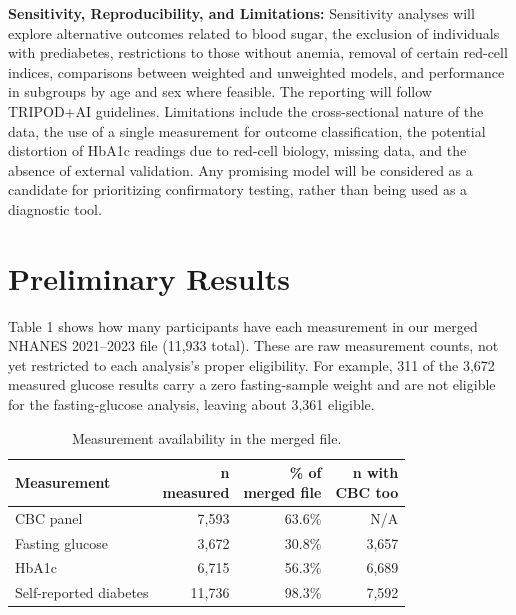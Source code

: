 \documentclass[conference]{IEEEtran}
\begin{document}
\noindent\textbf{Sensitivity, Reproducibility, and Limitations:} Sensitivity analyses will explore alternative outcomes related to blood sugar, the exclusion of individuals with prediabetes, restrictions to those without anemia, removal of certain red-cell indices, comparisons between weighted and unweighted models, and performance in subgroups by age and sex where feasible. The reporting will follow TRIPOD+AI guidelines. Limitations include the cross-sectional nature of the data, the use of a single measurement for outcome classification, the potential distortion of HbA1c readings due to red-cell biology, missing data, and the absence of external validation. Any promising model will be considered as a candidate for prioritizing confirmatory testing, rather than being used as a diagnostic tool.


\section{Preliminary Results}

Table 1 shows how many participants have each measurement in our merged NHANES 2021--2023 file (11,933 total). These are raw measurement counts, not yet restricted to each analysis's proper eligibility. For example, 311 of the 3,672 measured glucose results carry a zero fasting-sample weight and are not eligible for the fasting-glucose analysis, leaving about 3,361 eligible.



\begin{table}[H]
\caption{Measurement availability in the merged file.}
\label{tab:availability}
\centering
\footnotesize
\setlength{\tabcolsep}{3.6pt}
\renewcommand{\arraystretch}{1.18}
\begin{tabular}{@{}lrrr@{}}
\toprule
Measurement & \shortstack{n\\measured} & \shortstack{\% of\\merged file} & \shortstack{n with\\CBC too} \\
\midrule
CBC panel & 7,593 & 63.6\% & N/A \\
Fasting glucose & 3,672 & 30.8\% & 3,657 \\
HbA1c & 6,715 & 56.3\% & 6,689 \\
Self-reported diabetes & 11,736 & 98.3\% & 7,592 \\
\bottomrule
\end{tabular}
\end{table}
\end{document}
